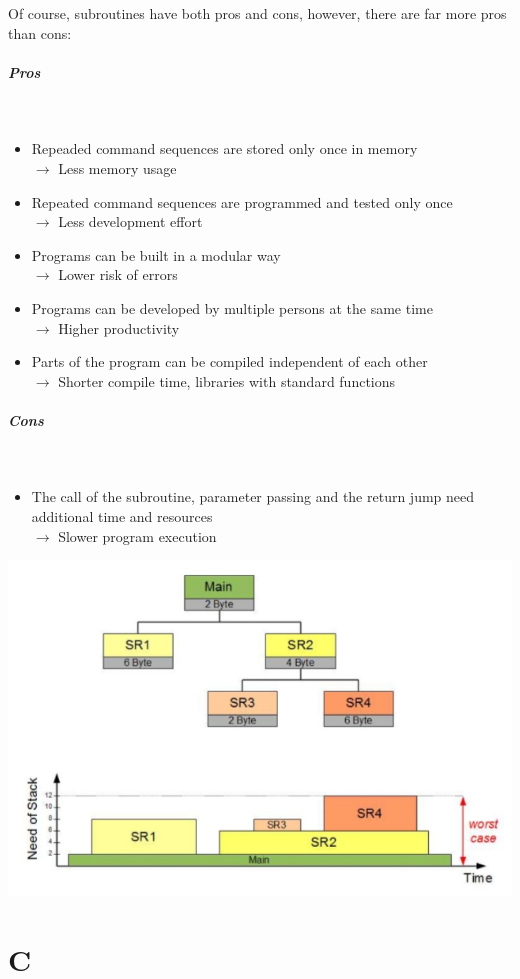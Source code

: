 \documentclass[a4paper, 11pt, nofootinbib]{book}
\begin{document}
\newpage

Of course, subroutines have both pros and cons, however, there are far more pros than cons:
\begin{multicols}{2}
	\paragraph{Pros} \mbox{}\\
	\begin{itemize}
		\item Repeaded command sequences are stored only once in memory \\
			$\rightarrow$ Less memory usage
		\item Repeated command sequences are programmed and tested only once \\
			$\rightarrow$ Less development effort
		\item Programs can be built in a modular way \\
			$\rightarrow$ Lower risk of errors
		\item Programs can be developed by multiple persons at the same time \\
			$\rightarrow$ Higher productivity
		\item Parts of the program can be compiled independent of each other \\
			$\rightarrow$ Shorter compile time, libraries with standard functions
	\end{itemize}
\columnbreak
	\paragraph{Cons}\mbox{}\\
	\begin{itemize}
		\item The call of the subroutine, parameter passing and the return jump need additional time and resources\\
			$\rightarrow$ Slower program execution
	\end{itemize}
		\includegraphics[keepaspectratio=true,height=13\baselineskip]{stack_consumption.jpg}
		\label{fig:stack_consumption}
\end{multicols}


\chapter{C}
\end{document}
